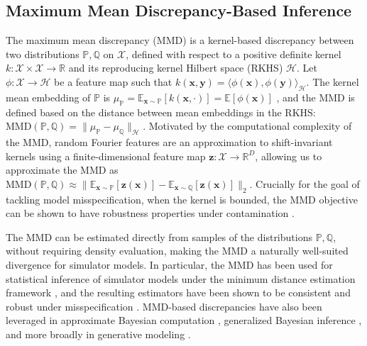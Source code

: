 \documentclass{article}
\theoremstyle{plain}
\theoremstyle{definition}
\theoremstyle{remark}
\begin{document}
\subsection{Maximum Mean Discrepancy-Based Inference}
\label{bg-mmd}

The maximum mean discrepancy (MMD) \citep{grettonKernelTwoSampleTest2012} is a kernel-based discrepancy between two distributions \( \mathbb{P}, \mathbb{Q} \) on \( \mathcal{X} \), defined with respect to a positive definite kernel \( k : \mathcal{X} \times \mathcal{X} \to \mathbb{R} \) and its reproducing kernel Hilbert space (RKHS) \( \mathcal{H} \). 
Let \( \phi : \mathcal{X} \to \mathcal{H} \) be a feature map such that \( k(\mathbf{x}, \mathbf{y}) = \langle \phi(\mathbf{x}), \phi(\mathbf{y}) \rangle_{\mathcal{H}} \). The kernel mean embedding of \( \mathbb{P} \) is \( \mu_{\mathbb{P}} = \mathbb{E}_{\mathbf{x} \sim \mathbb{P}} [k(\mathbf{x}, \cdot)] = \mathbb{E}[\phi(\mathbf{x})] \) \citep{muandetKernelMeanEmbedding2017b}, and the MMD is defined based on the distance between mean embeddings in the RKHS: \( \mathrm{MMD}(\mathbb{P}, \mathbb{Q}) = \| \mu_{\mathbb{P}} - \mu_{\mathbb{Q}} \|_{\mathcal{H}} \).
Motivated by the computational complexity of the MMD, random Fourier features \citep{rahimiRandomFeaturesLargeScale2007} are an approximation to shift-invariant kernels using a finite-dimensional feature map \( 
\mathbf{z}: \mathcal{X} \to \mathbb{R}^D \), allowing us to approximate the MMD as \( \mathrm{MMD}(\mathbb{P}, \mathbb{Q}) \approx \| \mathbb{E}_{
\mathbf{x}\sim \mathbb{P}} [\mathbf{z}(\mathbf{x})] - \mathbb{E}_{\mathbf{x} \sim \mathbb{Q}} [\mathbf{z}(\mathbf{x})] \|_2 \).
Crucially for the goal of tackling model misspecification, when the kernel is bounded, the MMD objective can be shown to have robustness properties under contamination \citep{cherief-abdellatifFiniteSampleProperties2022a}.

The MMD can be estimated directly from samples of the distributions \( \mathbb{P}, \mathbb{Q} \), without requiring density evaluation, making the MMD a naturally well-suited divergence for simulator models. In particular, the MMD has been used for statistical inference of simulator models under the minimum distance estimation framework \citep{wolfowitzMinimumDistanceMethod1957}, and the resulting estimators have been shown to be consistent and robust under misspecification \citep{briolStatisticalInferenceGenerative2019b}. MMD-based discrepancies have also been leveraged in approximate Bayesian computation \citep{parkK2ABCApproximateBayesian2016}, generalized Bayesian inference \citep{cherief-abdellatifMMDBayesRobustBayesian2020, dellaportaRobustBayesianInference2022b}, and more broadly in generative modeling \citep{liGenerativeMomentMatching2015b,dziugaiteTrainingGenerativeNeural2015b}.
\end{document}
